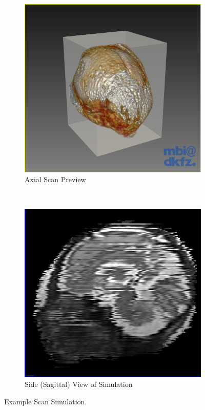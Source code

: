 \begin{figure}[H]
  \centering
  \begin{subfigure}[b]{0.5\textwidth}
    \includegraphics[width=\textwidth]{images/scan_simulation/scan_axial_preview.png}
    \caption{Axial Scan Preview}\label{fig:scansimulationpreview}
  \end{subfigure}%
  ~ %
  \begin{subfigure}[b]{0.5\textwidth}
    \includegraphics[width=\textwidth]{images/scan_simulation/scan_axial_result.png}
    \caption{Side (Sagittal) View of Simulation}\label{fig:scansimulationresult}
  \end{subfigure}
  \caption{Example Scan Simulation.}\label{fig:scansimulationexample}
\end{figure}

